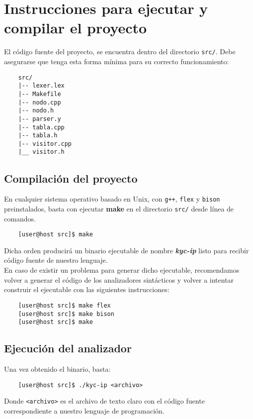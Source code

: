 \documentclass[12pt]{article}
\begin{document}
\section{Instrucciones para ejecutar y compilar el proyecto}\label{sec:s}

El código fuente del proyecto, se encuentra dentro del directorio \texttt{src/}. Debe asegurarse
que tenga esta forma mínima para su correcto funcionamiento:
\begin{verbatim}
    src/
    |-- lexer.lex
    |-- Makefile
    |-- nodo.cpp
    |-- nodo.h
    |-- parser.y
    |-- tabla.cpp
    |-- tabla.h
    |-- visitor.cpp
    |__ visitor.h

\end{verbatim}

\subsection{Compilación del proyecto}

En cualquier sistema operativo basado en Unix, con \texttt{g++}, \texttt{flex} y \texttt{bison} preinstalados, basta con ejecutar \textbf{make} en el directorio \texttt{src/} desde línea de comandos.

\begin{verbatim}
    [user@host src]$ make
\end{verbatim}
Dicha orden producirá un binario ejecutable de nombre \textit{\textbf{kyc-ip}} listo para recibir código fuente de nuestro lenguaje.\\
En caso de existir un problema para generar dicho ejecutable, recomendamos volver a generar el código de los analizadores sintácticos y volver a intentar construir el ejecutable con las siguientes instrucciones:
\begin{verbatim}
    [user@host src]$ make flex
    [user@host src]$ make bison
    [user@host src]$ make
\end{verbatim}

\subsection{Ejecución del analizador} 

Una vez obtenido el binario, basta:
\begin{verbatim}
    [user@host src]$ ./kyc-ip <archivo>
\end{verbatim}
Donde \texttt{<archivo>} es el archivo de texto claro con el código fuente correspondiente a nuestro lenguaje de programación.
\end{document}
